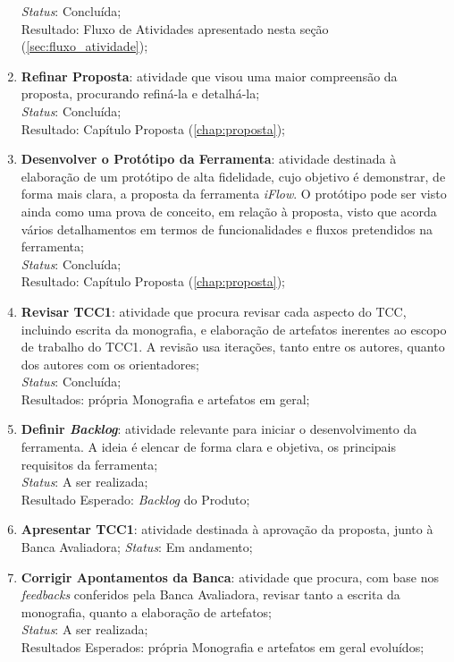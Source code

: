 \begin{enumerate}
    \textit{Status}: Concluída;
    \\
    Resultado: Fluxo de Atividades apresentado nesta seção (\ref{sec:fluxo_atividade});
    \item \textbf{Refinar Proposta}: atividade que visou uma maior compreensão da proposta, procurando refiná-la e detalhá-la;
    \\
    \textit{Status}: Concluída;
    \\
    Resultado: Capítulo Proposta (\ref{chap:proposta});
    \item \textbf{Desenvolver o Protótipo da Ferramenta}: atividade destinada à elaboração de um protótipo de alta fidelidade, cujo objetivo é demonstrar, de forma mais clara, a proposta da ferramenta \textit{iFlow}. O protótipo pode ser visto ainda como uma prova de conceito, em relação à proposta, visto que acorda vários detalhamentos em termos de funcionalidades e fluxos pretendidos na ferramenta;
    \\
    \textit{Status}: Concluída;
    \\
    Resultado: Capítulo Proposta (\ref{chap:proposta});
    \item \textbf{Revisar TCC1}: atividade que procura revisar cada aspecto do TCC, incluindo escrita da monografia, e elaboração de artefatos inerentes ao escopo de trabalho do TCC1. A revisão usa iterações, tanto entre os autores, quanto dos autores com os orientadores;
    \\
    \textit{Status}: Concluída;
    \\
    Resultados: própria Monografia e artefatos em geral;
    
    \item \textbf{Definir \textit{Backlog}}: atividade relevante para iniciar o desenvolvimento da ferramenta. A ideia é elencar de forma clara e objetiva, os principais requisitos da ferramenta;
    \\
    \textit{Status}: A ser realizada;
    \\
    Resultado Esperado: \textit{Backlog} do Produto;
    
    \item \label{item:revision} \textbf{Apresentar TCC1}: atividade destinada à aprovação da proposta, junto à Banca Avaliadora;
    \textit{Status}: Em andamento;
    
    \item \textbf{Corrigir Apontamentos da Banca}: atividade que procura, com base nos \textit{feedbacks} conferidos pela Banca Avaliadora, revisar tanto a escrita da monografia, quanto a elaboração de artefatos;
    \\
    \textit{Status}: A ser realizada;
    \\
    Resultados Esperados: própria Monografia e artefatos em geral evoluídos;
    

\end{enumerate}
